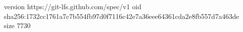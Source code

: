 version https://git-lfs.github.com/spec/v1
oid sha256:1732cc1761a7c7b554fb97d0f7116c42e7a36eee64361cda2e8fb557d7a463de
size 7730
